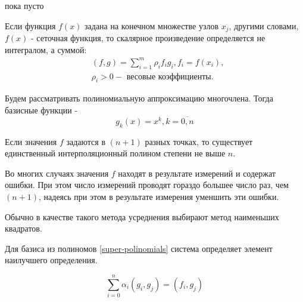 \begin{col-answer-preambule}
	\begin{plan}
    \item пока пусто
	\end{plan}
\end{col-answer-preambule}


Если функция $f(x)$ задана на конечном множестве узлов $x_j$, другими
словами, $f(x)$ - сеточная функция, то скалярное произведение определяется не
интегралом, а суммой:
\begin{equation}
  \begin{split}
    &(f, g) = \sum\limits_{i = 1}^m\rho_i f_i g_i, f_i = f(x_i),\\
    & \rho_i > 0 - \text{ весовые коэффициенты}.
  \end{split}
\end{equation}

Будем рассматривать полиномиальную аппроксимацию многочлена. Тогда базисные
функции -
\begin{equation}
  \label{super-polinomials}
  g_k(x) = x^k, k = \overline{0, n}
\end{equation}

Если значения $f$ задаются в $(n + 1)$ разных точках, то существует единственный
интерполяционный полином степени не выше $n$.

Во многих случаях значения $f$ находят в результате измерений и содержат ошибки.
При этом число измерений проводят гораздо большее число раз, чем $(n + 1)$,
надеясь при этом в результате измерения уменшить эти ошибки.

Обычно в качестве такого метода усреднения выбирают метод наименьших квадратов.

Для базиса из полиномов \eqref{super-polinomials} система определяет элемент
наилучшего определения.

\begin{equation}
  \label{14-system}
  \sum\limits_{i = 0}^n \alpha_i(g_i, g_j) = (f_i, g_j)
\end{equation}

